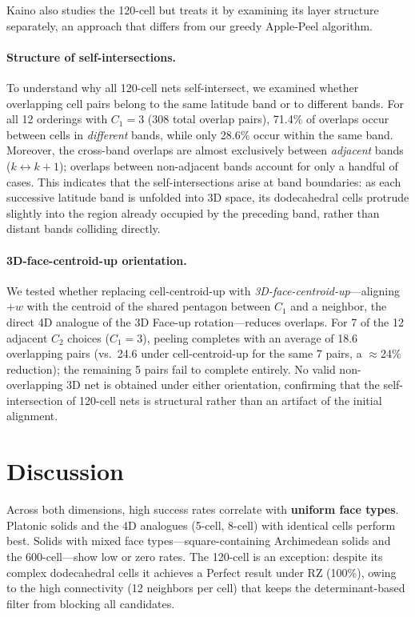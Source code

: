 \documentclass[12pt]{article}
\theoremstyle{definition}
\begin{document}
Kaino \cite{Kaino2019} also studies the 120-cell but treats it by
examining its layer structure separately, an approach that differs
from our greedy Apple-Peel algorithm.

\paragraph{Structure of self-intersections.}
To understand why all 120-cell nets self-intersect, we examined
whether overlapping cell pairs belong to the same latitude band
or to different bands.
For all 12 orderings with $C_1=3$ (308 total overlap pairs),
71.4\% of overlaps occur between cells in \emph{different} bands,
while only 28.6\% occur within the same band.
Moreover, the cross-band overlaps are almost exclusively between
\emph{adjacent} bands ($k \leftrightarrow k{+}1$); overlaps between
non-adjacent bands account for only a handful of cases.
This indicates that the self-intersections arise at band boundaries:
as each successive latitude band is unfolded into 3D space,
its dodecahedral cells protrude slightly into the region already
occupied by the preceding band, rather than distant bands
colliding directly.

\paragraph{3D-face-centroid-up orientation.}
We tested whether replacing cell-centroid-up with
\emph{3D-face-centroid-up}---aligning $+w$ with the centroid of
the shared pentagon between $C_1$ and a neighbor, the direct
4D analogue of the 3D Face-up rotation---reduces overlaps.
For 7 of the 12 adjacent $C_2$ choices ($C_1=3$), peeling
completes with an average of 18.6 overlapping pairs
(vs.\ 24.6 under cell-centroid-up for the same 7 pairs, a $\approx$24\% reduction);
the remaining 5 pairs fail to complete entirely.
No valid non-overlapping 3D net is obtained under either orientation,
confirming that the self-intersection of 120-cell nets is structural
rather than an artifact of the initial alignment.

\clearpage
\section{Discussion}
\label{sec:discussion}

Across both dimensions, high success rates correlate with
\textbf{uniform face types}.
Platonic solids and the 4D analogues (5-cell, 8-cell) with identical
cells perform best.
Solids with mixed face types---square-containing Archimedean solids
and the 600-cell---show low or zero rates.
The 120-cell is an exception: despite its complex dodecahedral cells it
achieves a Perfect result under RZ (100\%), owing to the high connectivity
(12 neighbors per cell) that keeps the determinant-based filter from
blocking all candidates.
\end{document}
